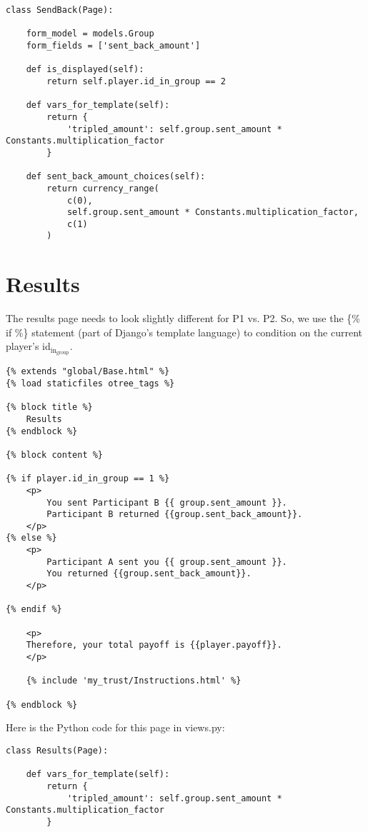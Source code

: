 \documentclass[11pt]{article}
\begin{document}
\begin{verbatim}
class SendBack(Page):

    form_model = models.Group
    form_fields = ['sent_back_amount']

    def is_displayed(self):
        return self.player.id_in_group == 2

    def vars_for_template(self):
        return {
            'tripled_amount': self.group.sent_amount * Constants.multiplication_factor
        }

    def sent_back_amount_choices(self):
        return currency_range(
            c(0),
            self.group.sent_amount * Constants.multiplication_factor,
            c(1)
        )
\end{verbatim}

\section{Results}
\label{sec:orgheadline8}

The results page needs to look slightly different for P1 vs. P2. So, we use the \{\% if \%\} statement (part of Django’s template language) to condition on the current player’s id\(_{\text{in}}_{\text{group}}\).

\begin{verbatim}
{% extends "global/Base.html" %}
{% load staticfiles otree_tags %}

{% block title %}
    Results
{% endblock %}

{% block content %}

{% if player.id_in_group == 1 %}
    <p>
        You sent Participant B {{ group.sent_amount }}.
        Participant B returned {{group.sent_back_amount}}.
    </p>
{% else %}
    <p>
        Participant A sent you {{ group.sent_amount }}.
        You returned {{group.sent_back_amount}}.
    </p>

{% endif %}

    <p>
    Therefore, your total payoff is {{player.payoff}}.
    </p>

    {% include 'my_trust/Instructions.html' %}

{% endblock %}
\end{verbatim}

Here is the Python code for this page in views.py:
\begin{verbatim}
class Results(Page):

    def vars_for_template(self):
        return {
            'tripled_amount': self.group.sent_amount * Constants.multiplication_factor
        }
\end{verbatim}
\end{document}
